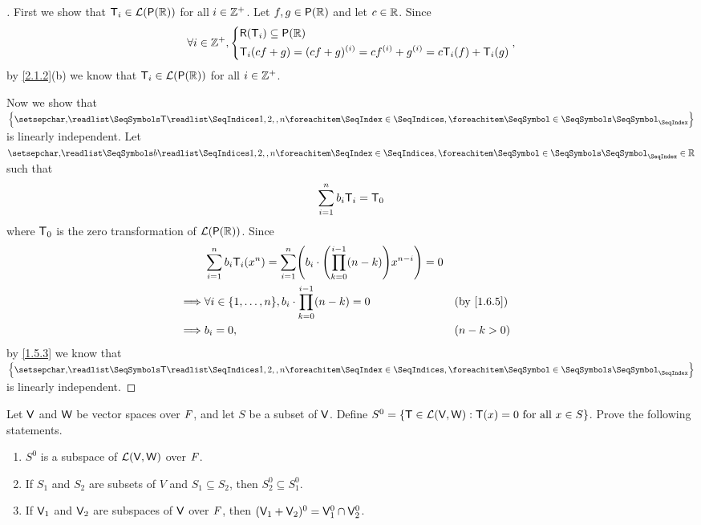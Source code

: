 \begin{proof}[]
	First we show that \(\T_i \in \ls(\ps{\R})\) for all \(i \in \mathbb{Z}^+\).
	Let \(f, g \in \ps{\R}\) and let \(c \in \mathbb{R}\).
	Since
	\[
		\forall i \in \Z^+, \begin{dcases}
			\rg{\T_i} \subseteq \ps{\R} \\
			\T_i(cf + g) = (cf + g)^{(i)} = c f^{(i)} + g^{(i)} = c \T_i(f) + \T_i(g)
		\end{dcases},
	\]
	by \cref{2.1.2}(b) we know that \(\T_i \in \ls(\ps{\R})\) for all \(i \in \mathbb{Z}^+\).

	Now we show that \(\set{\seq{\T}{1,2,,n}}\) is linearly independent.
	Let \(\seq{b}{1,2,,n} \in \R\) such that
	\[
		\sum_{i = 1}^n b_i \mathsf{T}_i = \mathsf{T}_0
	\]
	where \(\mathsf{T}_0\) is the zero transformation of \(\ls(\ps{\R})\).
	Since
	\begin{align*}
		         & \sum_{i = 1}^n b_i \T_i(x^n) = \sum_{i = 1}^n \pa{b_i \cdot \pa{\prod_{k = 0}^{i - 1} (n - k)} x^{n - i}} = 0                  \\
		\implies & \forall i \in \set{1, \dots, n}, b_i \cdot \prod_{k = 0}^{i - 1} (n - k) = 0                                  &  & \by{1.6.5}  \\
		\implies & b_i = 0,                                                                                                      &  & (n - k > 0)
	\end{align*}
	by \cref{1.5.3} we know that \(\set{\seq{\T}{1,2,,n}}\) is linearly independent.
\end{proof}

\begin{ex}\label{ex:2.2.15}
	Let \(\mathsf{V}\) and \(\mathsf{W}\) be vector spaces over \(\mathit{F}\), and let \(S\) be a subset of \(\mathsf{V}\).
	Define \(S^0 = \left\lbrace\mathsf{T} \in \mathcal{L}(\mathsf{V}, \mathsf{W}) : \mathsf{T}(x) = 0 \text{ for all } x \in S\right\rbrace\).
	Prove the following statements.
	\begin{enumerate}
		\item \(S^0\) is a subspace of \(\mathcal{L}(\mathsf{V}, \mathsf{W})\) over \(\mathit{F}\).
		\item If \(S_1\) and \(S_2\) are subsets of \(V\) and \(S_1 \subseteq S_2\), then \(S_2^0 \subseteq S_1^0\).
		\item If \(\mathsf{V}_1\) and \(\mathsf{V}_2\) are subspaces of \(\mathsf{V}\) over \(\mathit{F}\), then \((\mathsf{V}_1 + \mathsf{V}_2)^0 = \mathsf{V}_1^0 \cap \mathsf{V}_2^0\).
	\end{enumerate}
\end{ex}

